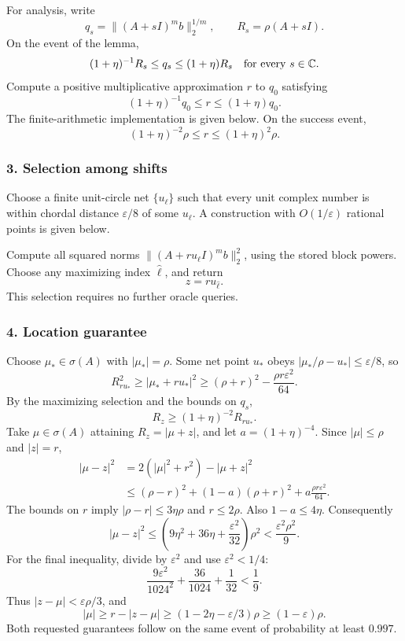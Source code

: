 \documentclass[10pt,a4paper]{article}
\begin{document}
For analysis, write \[
q_s=\|(A+sI)^mb\|_2^{1/m},\qquad R_s=\rho(A+sI).
\] On the event of the lemma, \[
(1+\eta)^{-1}R_s\le q_s\le(1+\eta)R_s
\quad\hbox{for every }s\in\mathbb C.
\] Compute a positive multiplicative approximation \(r\) to \(q_0\)
satisfying \[
(1+\eta)^{-1}q_0\le r\le(1+\eta)q_0.
\] The finite-arithmetic implementation is given below. On the success
event, \[
(1+\eta)^{-2}\rho\le r\le(1+\eta)^2\rho.
\]

\subsubsection{3. Selection among shifts}\label{selection-among-shifts}

Choose a finite unit-circle net \(\{u_\ell\}\) such that every unit
complex number is within chordal distance \(\varepsilon/8\) of some
\(u_\ell\). A construction with \(O(1/\varepsilon)\) rational points is
given below.

Compute all squared norms \(\|(A+ru_\ell I)^mb\|_2^2\), using the stored
block powers. Choose any maximizing index \(\widehat\ell\), and return
\[
z=ru_{\widehat\ell}.
\] This selection requires no further oracle queries.

\subsubsection{4. Location guarantee}\label{location-guarantee}

Choose \(\mu_*\in\sigma(A)\) with \(|\mu_*|=\rho\). Some net point
\(u_*\) obeys \(|\mu_*/\rho-u_*|\le\varepsilon/8\), so \[
R_{ru_*}^2\ge|\mu_*+ru_*|^2
\ge(\rho+r)^2-\frac{\rho r\varepsilon^2}{64}.
\] By the maximizing selection and the bounds on \(q_s\), \[
R_z\ge(1+\eta)^{-2}R_{ru_*}.
\] Take \(\mu\in\sigma(A)\) attaining \(R_z=|\mu+z|\), and let
\(a=(1+\eta)^{-4}\). Since \(|\mu|\le\rho\) and \(|z|=r\), \[
\begin{aligned}
|\mu-z|^2
&=2(|\mu|^2+r^2)-|\mu+z|^2\\
&\le(\rho-r)^2+(1-a)(\rho+r)^2
  +a\frac{\rho r\varepsilon^2}{64}.
\end{aligned}
\] The bounds on \(r\) imply \(|\rho-r|\le3\eta\rho\) and \(r\le2\rho\).
Also \(1-a\le4\eta\). Consequently \[
|\mu-z|^2
\le\left(9\eta^2+36\eta+\frac{\varepsilon^2}{32}\right)\rho^2
<\frac{\varepsilon^2\rho^2}{9}.
\] For the final inequality, divide by \(\varepsilon^2\) and use
\(\varepsilon^2<1/4\): \[
\frac{9\varepsilon^2}{1024^2}+\frac{36}{1024}+\frac1{32}<\frac19.
\] Thus \(|z-\mu|<\varepsilon\rho/3\), and \[
|\mu|\ge r-|z-\mu|
\ge(1-2\eta-\varepsilon/3)\rho
\ge(1-\varepsilon)\rho.
\] Both requested guarantees follow on the same event of probability at
least \(0.997\).
\end{document}
